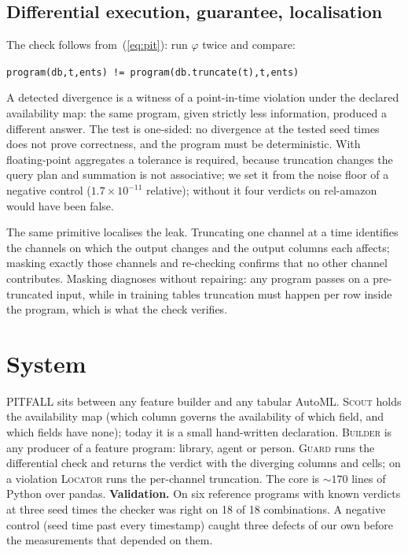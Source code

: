 \documentclass[conference]{IEEEtran}
\begin{document}
\subsection{Differential execution, guarantee, localisation}
The check follows from~(\ref{eq:pit}): run $\varphi$ twice and compare:
\begin{center}\vspace{-3pt}\small
\texttt{program(db,t,ents) != program(db.truncate(t),t,ents)}
\vspace{-3pt}\end{center}
A detected divergence is a witness of a point-in-time violation under the declared
availability map: the same program, given strictly less information, produced a different answer. The test is one-sided: no divergence at the tested seed times does not prove
correctness, and the program must be deterministic. With floating-point aggregates a
tolerance is required, because truncation changes the query plan and summation is not
associative; we set it from the noise floor of a negative control ($1.7\!\times\!10^{-11}$
relative); without it four verdicts on \mbox{rel-amazon} would have been false.

The same primitive localises the leak. Truncating one channel at a time identifies the
channels on which the output changes and the output columns each affects; masking
exactly those channels and re-checking confirms that no other channel contributes.
Masking diagnoses without repairing: any program passes on a pre-truncated input, while
in training tables truncation must happen per row inside the program, which is what the
check verifies.

\section{System}

PITFALL sits between any feature builder and any tabular AutoML. \textsc{Scout} holds the
availability map (which column governs the availability of which field, and which fields
have none); today it is a small hand-written declaration. \textsc{Builder} is any producer of a feature program: library,
agent or person. \textsc{Guard} runs the differential check and returns the verdict with
the diverging columns and cells; on a violation \textsc{Locator} runs the per-channel
truncation. The core is ${\sim}170$ lines of Python over pandas.
\textbf{Validation.} On six reference programs
with known verdicts at three seed times the checker was right on 18 of 18 combinations.
A negative control (seed time past every timestamp) caught three defects of our own
before the measurements that depended on them.
\end{document}
